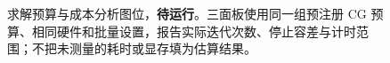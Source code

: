 \begin{figure}[!htbp]
  \centering
  \begin{minipage}[t]{0.32\linewidth}
  \end{minipage}\hfill
  \begin{minipage}[t]{0.32\linewidth}
  \end{minipage}\hfill
  \begin{minipage}[t]{0.32\linewidth}
  \end{minipage}
  \caption{求解预算与成本分析图位，\textbf{待运行}。三面板使用同一组预注册 CG 预算、相同硬件和批量设置，报告实际迭代次数、停止容差与计时范围；不把未测量的耗时或显存填为估算结果。}
  \label{fig:ink-cost-analysis}
\end{figure}
